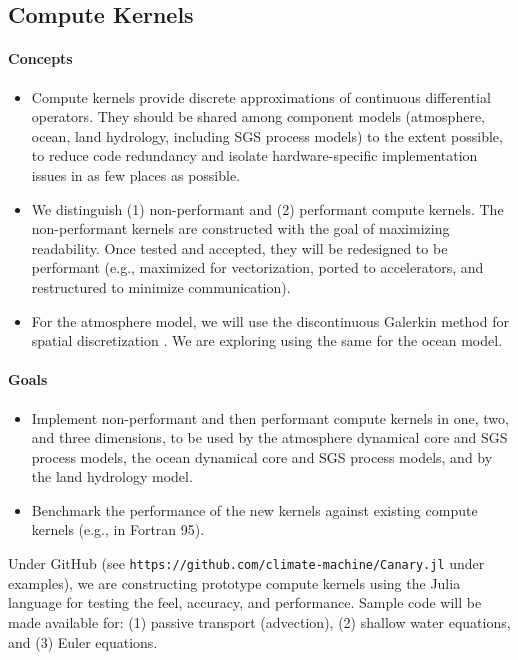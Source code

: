 \documentclass{article}
\begin{document}
\subsection{Compute Kernels}

\paragraph{Concepts}
\begin{itemize}
    \item Compute kernels provide discrete approximations of continuous differential operators. They should be shared among component models (atmosphere, ocean, land hydrology, including SGS process models) to the extent possible, to reduce code redundancy and isolate hardware-specific implementation issues in as few places as possible. 
    \item We distinguish (1) non-performant and (2) performant compute kernels. The non-performant kernels are constructed with the goal of maximizing readability.  Once tested and accepted, they will be redesigned to be performant (e.g., maximized for vectorization, ported to accelerators, and restructured to minimize communication).
    \item For the atmosphere model, we will use the discontinuous Galerkin method for spatial discretization \citep{abdi:2016}. We are exploring using the same for the ocean model.
\end{itemize}

\paragraph{Goals}
\begin{itemize}
    \item Implement non-performant and then performant compute kernels in one, two, and three dimensions, to be used by the atmosphere dynamical core and SGS process models, the ocean dynamical core and SGS process models, and by the land hydrology model.
    \item Benchmark the performance of the new kernels against existing compute kernels (e.g., in Fortran 95).
\end{itemize}

Under GitHub (see  \texttt{https://github.com/climate-machine/Canary.jl} under examples), we are constructing prototype compute kernels using the Julia language for testing the feel, accuracy, and performance. Sample code will be made available for: (1) passive transport (advection), (2) shallow water equations, and (3) Euler equations.  
\end{document}
